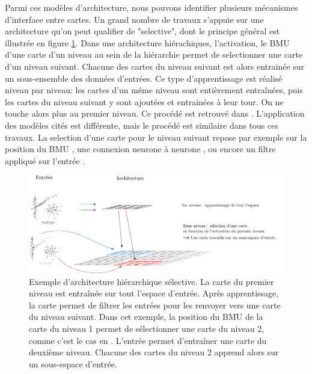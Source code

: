 \documentclass[../main]{subfiles}
\begin{document}
Parmi ces modèles d'architecture, nous pouvons identifier plusieurs mécanismes d'interface entre cartes.
Un grand nombre de travaux s'appuie sur une architecture qu'on peut qualifier de "selective", dont le principe général est illustrée en figure \ref{fig:hsom_selective}.
Dans une architecture hiérachiques, l'activation, le BMU d'une carte d'un niveau au sein de la hiérarchie permet de selectionner une carte d'un niveau suivant. Chacune des cartes du niveau suivant est alors entrainée sur un sous-ensemble des données d'entrées. Ce type d'apprentissage est réalisé niveau par niveau: les cartes d'un même niveau sont entièrement entraînées, puis les cartes du niveau suivant y sont ajoutées et entrainées à leur tour. On ne touche alors plus au premier niveau. 
Ce procédé est retrouvé dans \cite{barbalho_hierarchical_2001,suganthan_pattern_2001,miikkulainen_script_1992,dittenbach_growing_2000,ordonez_hierarchical_2010,zhao_stacked_2015}. L'application des modèles cités est différente, mais le procédé est similaire dans tous ces travaux.
La selection d'une carte pour le niveau suivant repose par exemple sur la position du BMU \cite{barbalho_hierarchical_2001}, une connexion neurone à neurone \cite{??}, ou encore un filtre appliqué sur l'entrée \cite{zhao_stacked_2015}.

\begin{figure}
    \includegraphics[width=\textwidth]{HSOM_selective.pdf}
    \caption{Exemple d'architecture hiérarchique sélective. La carte du premier niveau est entraînée sur tout l'espace d'entrée. Après apprentissage, la carte permet de filtrer les entrées pour les renvoyer vers une carte du niveau suivant. Dans cet exemple, la position du BMU de la carte du niveau 1 permet de sélectionner une carte du niveau 2, comme c'est le cas en \cite{barbalho_hierarchical_2001}. 
    L'entrée permet d'entraîner une carte du deuxième niveau. Chacune des cartes du niveau 2 apprend alors sur un sous-espace d'entrée.\label{fig:hsom_selective}}
\end{figure}
\end{document}
